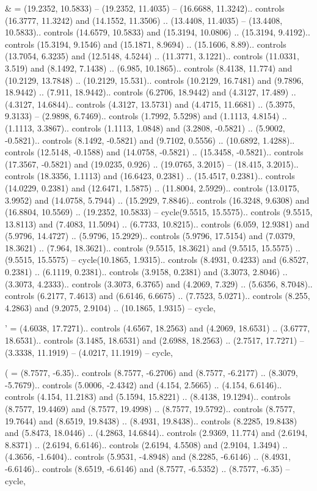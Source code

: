 \& = {(19.2352, 10.5833) -- (19.2352, 11.4035) -- (16.6688, 11.3242).. controls (16.3777, 11.3242) and (14.1552, 11.3506) .. (13.4408, 11.4035) -- (13.4408, 10.5833).. controls (14.6579, 10.5833) and (15.3194, 10.0806) .. (15.3194, 9.4192).. controls (15.3194, 9.1546) and (15.1871, 8.9694) .. (15.1606, 8.89).. controls (13.7054, 6.3235) and (12.5148, 4.5244) .. (11.3771, 3.1221).. controls (11.0331, 3.519) and (8.1492, 7.1438) .. (6.985, 10.1865).. controls (8.4138, 11.774) and (10.2129, 13.7848) .. (10.2129, 15.531).. controls (10.2129, 16.7481) and (9.7896, 18.9442) .. (7.911, 18.9442).. controls (6.2706, 18.9442) and (4.3127, 17.489) .. (4.3127, 14.6844).. controls (4.3127, 13.5731) and (4.4715, 11.6681) .. (5.3975, 9.3133) -- (2.9898, 6.7469).. controls (1.7992, 5.5298) and (1.1113, 4.8154) .. (1.1113, 3.3867).. controls (1.1113, 1.0848) and (3.2808, -0.5821) .. (5.9002, -0.5821).. controls (8.1492, -0.5821) and (9.7102, 0.5556) .. (10.6892, 1.4288).. controls (12.5148, -0.1588) and (14.0758, -0.5821) .. (15.3458, -0.5821).. controls (17.3567, -0.5821) and (19.0235, 0.926) .. (19.0765, 3.2015) -- (18.415, 3.2015).. controls (18.3356, 1.1113) and (16.6423, 0.2381) .. (15.4517, 0.2381).. controls (14.0229, 0.2381) and (12.6471, 1.5875) .. (11.8004, 2.5929).. controls (13.0175, 3.9952) and (14.0758, 5.7944) .. (15.2929, 7.8846).. controls (16.3248, 9.6308) and (16.8804, 10.5569) .. (19.2352, 10.5833) -- cycle(9.5515, 15.5575).. controls (9.5515, 13.8113) and (7.4083, 11.5094) .. (6.7733, 10.8215).. controls (6.059, 12.9381) and (5.9796, 14.4727) .. (5.9796, 15.2929).. controls (5.9796, 17.5154) and (7.0379, 18.3621) .. (7.964, 18.3621).. controls (9.5515, 18.3621) and (9.5515, 15.5575) .. (9.5515, 15.5575) -- cycle(10.1865, 1.9315).. controls (8.4931, 0.4233) and (6.8527, 0.2381) .. (6.1119, 0.2381).. controls (3.9158, 0.2381) and (3.3073, 2.8046) .. (3.3073, 4.2333).. controls (3.3073, 6.3765) and (4.2069, 7.329) .. (5.6356, 8.7048).. controls (6.2177, 7.4613) and (6.6146, 6.6675) .. (7.7523, 5.0271).. controls (8.255, 4.2863) and (9.2075, 2.9104) .. (10.1865, 1.9315) -- cycle},

' = {(4.6038, 17.7271).. controls (4.6567, 18.2563) and (4.2069, 18.6531) .. (3.6777, 18.6531).. controls (3.1485, 18.6531) and (2.6988, 18.2563) .. (2.7517, 17.7271) -- (3.3338, 11.1919) -- (4.0217, 11.1919) -- cycle},

( = {(8.7577, -6.35).. controls (8.7577, -6.2706) and (8.7577, -6.2177) .. (8.3079, -5.7679).. controls (5.0006, -2.4342) and (4.154, 2.5665) .. (4.154, 6.6146).. controls (4.154, 11.2183) and (5.1594, 15.8221) .. (8.4138, 19.1294).. controls (8.7577, 19.4469) and (8.7577, 19.4998) .. (8.7577, 19.5792).. controls (8.7577, 19.7644) and (8.6519, 19.8438) .. (8.4931, 19.8438).. controls (8.2285, 19.8438) and (5.8473, 18.0446) .. (4.2863, 14.6844).. controls (2.9369, 11.774) and (2.6194, 8.8371) .. (2.6194, 6.6146).. controls (2.6194, 4.5508) and (2.9104, 1.3494) .. (4.3656, -1.6404).. controls (5.9531, -4.8948) and (8.2285, -6.6146) .. (8.4931, -6.6146).. controls (8.6519, -6.6146) and (8.7577, -6.5352) .. (8.7577, -6.35) -- cycle},

